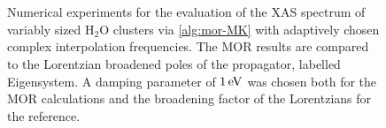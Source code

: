 \begin{figure}[hbtp]
\centering
{}%
%
\\[10pt]
%
%
%
\\[10pt]
\caption{Numerical experiments for the evaluation of the XAS spectrum of variably sized
H$_2$O clusters via \cref{alg:mor-MK} with adaptively chosen complex interpolation
frequencies. The MOR results are compared to the Lorentzian broadened poles of the
propagator, labelled Eigensystem. A damping parameter of $1\,\mathrm{eV}$ was chosen both
for the MOR calculations and the broadening factor of the Lorentzians for the
reference.}
\label{fig:water}
\end{figure}

